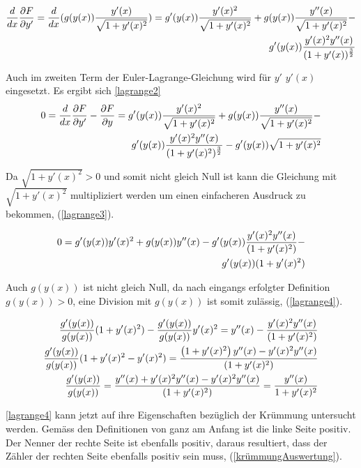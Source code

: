\begin{align}
	\frac{d}{dx} \frac{\partial F}{\partial y'} = \frac{d}{dx} (g(y(x)) \frac{y'(x)}{\sqrt{1 + y'(x)^2}})
	 = g'(y(x)) \frac{y'(x)^2}{\sqrt{1 + y'(x)^2}} + g(y(x)) \frac{y''(x)}{\sqrt{1 + y'(x)^2}} - \notag \\
	 g'(y(x)) \frac{y'(x)^2 y''(x)}{(1 + y'(x))^\frac{3}{2}} 
	 \label{lagrange1}
\end{align}

Auch im zweiten Term der Euler-Lagrange-Gleichung wird für $y'$ $y'(x)$ eingesetzt. Es ergibt sich \eqref{lagrange2}
\begin{align}
	0 = \frac{d}{dx} \frac{\partial F}{\partial y'} - \frac{\partial F}{\partial y} = 
	g'(y(x)) \frac{y'(x)^2}{\sqrt{1 + y'(x)^2}} + g(y(x)) \frac{y''(x)}{\sqrt{1 + y'(x)^2}} - \notag \\
	g'(y(x)) \frac{y'(x)^2 y''(x)}{(1 + y'(x)^2)^\frac{3}{2}}  - g'(y(x)) \sqrt{1 + y'(x)^2}
	\label{lagrange2}
\end{align}

Da $\sqrt{1 + y'(x)^2} > 0$ und somit nicht gleich Null ist kann die Gleichung mit $\sqrt{1 + y'(x)^2}$  multipliziert werden um einen einfacheren Ausdruck zu bekommen, (\eqref{lagrange3}).

\begin{align}
	0 = g'(y(x)) y'(x)^2 + g(y(x)) y''(x) - g'(y(x)) \frac{y'(x)^2 y''(x)}{(1 + y'(x)^2)} - \notag \\ 
	g'(y(x)) (1 + y'(x)^2)
	\label{lagrange3}
\end{align}

Auch $g(y(x))$ ist nicht gleich Null, da nach eingangs erfolgter Definition $g(y(x)) > 0$, eine Division mit $g(y(x))$ ist somit zulässig, (\eqref{lagrange4}).

\begin{align}
	\frac{g'(y(x))}{g(y(x))} (1 + y'(x)^2) - \frac{g'(y(x))}{g(y(x))} y'(x)^2 =  y''(x) - \frac{y'(x)^2 y''(x)}{(1 + y'(x)^2)} \notag \\
	\frac{g'(y(x))}{g(y(x))} (1 + y'(x)^2 - y'(x)^2) = \frac{\left(1 + y'(x)^2 \right)y''(x) - y'(x)^2 y''(x)}{(1 + y'(x)^2)} \notag \\
	\frac{g'(y(x))}{g(y(x))} = \frac{y''(x) + y'(x)^2 y''(x) - y'(x)^2 y''(x)}{(1 + y'(x)^2)} = \frac{y''(x)}{1 + y'(x)^2}
	\label{lagrange4}
\end{align}


\eqref{lagrange4} kann jetzt auf ihre Eigenschaften bezüglich der Krümmung untersucht werden. Gemäss den Definitionen von ganz am Anfang ist die linke Seite positiv. 
Der Nenner der rechte Seite ist ebenfalls positiv, daraus resultiert, dass der Zähler der rechten Seite ebenfalls positiv sein muss, (\eqref{krümmungAuswertung}).

